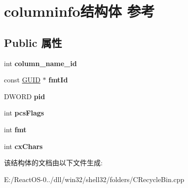 \hypertarget{structcolumninfo}{}\section{columninfo结构体 参考}
\label{structcolumninfo}
\subsection*{Public 属性}
\begin{DoxyCompactItemize}
\item 
\mbox{\label{structcolumninfo_a611be489ca255e91a990cb9795d12d79}} 
int {\bfseries column\+\_\+name\+\_\+id}
\item 
\mbox{\label{structcolumninfo_a27952ce1d53630ce20c9c5f4179d17f0}} 
const \hyperlink{interface_g_u_i_d}{G\+U\+ID} $\ast$ {\bfseries fmt\+Id}
\item 
\mbox{\label{structcolumninfo_add97c31db036cea39867b96402a99ba7}} 
D\+W\+O\+RD {\bfseries pid}
\item 
\mbox{\label{structcolumninfo_a1b8eadc65d346d6ae887fe213f1a6ee1}} 
int {\bfseries pcs\+Flags}
\item 
\mbox{\label{structcolumninfo_a460109e06522e2ee268377cdd844c0d2}} 
int {\bfseries fmt}
\item 
\mbox{\label{structcolumninfo_af4672017d7d773cd2d7c96c8a854f91c}} 
int {\bfseries cx\+Chars}
\end{DoxyCompactItemize}


该结构体的文档由以下文件生成\+:\begin{DoxyCompactItemize}
\item 
E\+:/\+React\+O\+S-\/0../dll/win32/shell32/folders/C\+Recycle\+Bin.\+cpp\end{DoxyCompactItemize}
